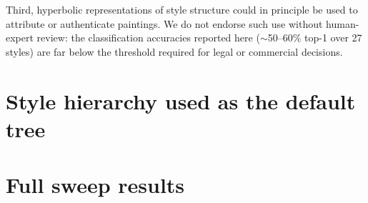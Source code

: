 \documentclass[11pt]{article}
\begin{document}
Third, hyperbolic representations of style structure could in principle be
used to attribute or authenticate paintings. We do not endorse such use
without human-expert review: the classification accuracies reported here
($\sim$50--60\% top-1 over 27 styles) are far below the threshold required
for legal or commercial decisions.




\appendix

\section{Style hierarchy used as the default tree}\label{app:tree}

\section{Full sweep results}
\end{document}
